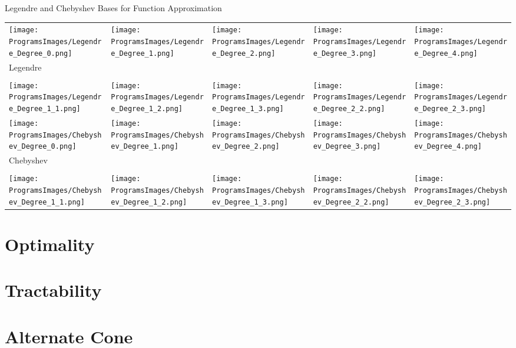 \documentclass[10pt,compress,xcolor={usenames,dvipsnames},aspectratio=169]{beamer}
\begin{document}
\begin{frame}{Legendre and Chebyshev Bases for Function Approximation}
\vspace{-3ex}
	\begin{tabular}{>{\centering}m{}>{\centering}m{}>{\centering}m{}>{\centering}m{}>{\centering}m{}}
		\texttt{[image: ProgramsImages/Legendre\_Degree\_0.png]}  &
		\texttt{[image: ProgramsImages/Legendre\_Degree\_1.png]}  &
		\texttt{[image: ProgramsImages/Legendre\_Degree\_2.png]}  &
		\texttt{[image: ProgramsImages/Legendre\_Degree\_3.png]}  &
		\texttt{[image: ProgramsImages/Legendre\_Degree\_4.png]} 
	\tabularnewline[-7ex]
	Legendre
	\tabularnewline
	\tabularnewline
		\texttt{[image: ProgramsImages/Legendre\_Degree\_1\_1.png]}  &
\texttt{[image: ProgramsImages/Legendre\_Degree\_1\_2.png]}  &
\texttt{[image: ProgramsImages/Legendre\_Degree\_1\_3.png]}  &
\texttt{[image: ProgramsImages/Legendre\_Degree\_2\_2.png]}  &
\texttt{[image: ProgramsImages/Legendre\_Degree\_2\_3.png]} 
\tabularnewline[0ex]
		\texttt{[image: ProgramsImages/Chebyshev\_Degree\_0.png]}  &
\texttt{[image: ProgramsImages/Chebyshev\_Degree\_1.png]}  &
\texttt{[image: ProgramsImages/Chebyshev\_Degree\_2.png]}  &
\texttt{[image: ProgramsImages/Chebyshev\_Degree\_3.png]}  &
\texttt{[image: ProgramsImages/Chebyshev\_Degree\_4.png]} 
\tabularnewline[-7ex]
Chebyshev \tabularnewline
\tabularnewline
\texttt{[image: ProgramsImages/Chebyshev\_Degree\_1\_1.png]}  &
\texttt{[image: ProgramsImages/Chebyshev\_Degree\_1\_2.png]}  &
\texttt{[image: ProgramsImages/Chebyshev\_Degree\_1\_3.png]}  &
\texttt{[image: ProgramsImages/Chebyshev\_Degree\_2\_2.png]}  &
\texttt{[image: ProgramsImages/Chebyshev\_Degree\_2\_3.png]} 
	\end{tabular}
\end{frame}


\section{Optimality}


\section{Tractability}


\section{Alternate Cone}
\end{document}
